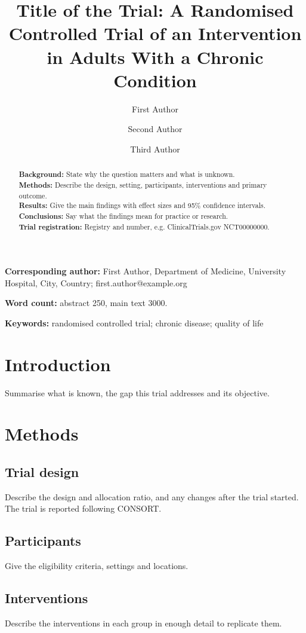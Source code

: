 \documentclass[11pt,a4paper]{article}
\title{Title of the Trial: A Randomised Controlled Trial of an Intervention in Adults With a Chronic Condition}
\author[1]{First Author}
\author[1,2]{Second Author}
\author[2]{Third Author}
\affil[1]{Department of Medicine, University Hospital, City, Country}
\affil[2]{Clinical Trials Unit, University, City, Country}
\date{}
\begin{document}
\maketitle

\noindent\textbf{Corresponding author:} First Author, Department of Medicine,
University Hospital, City, Country; first.author@example.org

\noindent\textbf{Word count:} abstract 250, main text 3000.

\begin{abstract}
\noindent\textbf{Background:} State why the question matters and what is unknown.\\
\textbf{Methods:} Describe the design, setting, participants, interventions and primary outcome.\\
\textbf{Results:} Give the main findings with effect sizes and 95\% confidence intervals.\\
\textbf{Conclusions:} Say what the findings mean for practice or research.\\
\textbf{Trial registration:} Registry and number, e.g. ClinicalTrials.gov NCT00000000.
\end{abstract}

\noindent\textbf{Keywords:} randomised controlled trial; chronic disease; quality of life

\clearpage

\section{Introduction}
Summarise what is known, the gap this trial addresses and its objective.

\section{Methods}
\subsection{Trial design}
Describe the design and allocation ratio, and any changes after the trial
started. The trial is reported following CONSORT.\cite{schulz2010consort}

\subsection{Participants}
Give the eligibility criteria, settings and locations.

\subsection{Interventions}
Describe the interventions in each group in enough detail to replicate them.
\end{document}
